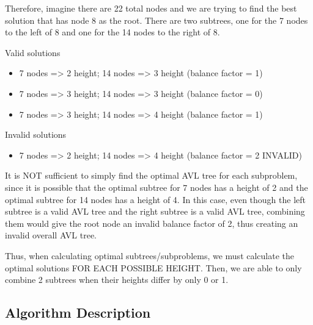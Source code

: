 \documentclass[a4paper]{article}
\begin{document}
Therefore, imagine there are 22 total nodes and we are trying to find the best solution that has node 8 as the root. There are two subtrees, one for the 7 nodes to the left of 8 and one for the 14 nodes to the right of 8.

Valid solutions
\begin{itemize}
    \item 7 nodes => 2 height; 14 nodes => 3 height (balance factor = 1)
    \item 7 nodes => 3 height; 14 nodes => 3 height (balance factor = 0)
    \item 7 nodes => 3 height; 14 nodes => 4 height (balance factor = 1)
\end{itemize}

Invalid solutions
\begin{itemize}
    \item 7 nodes => 2 height; 14 nodes => 4 height (balance factor = 2 INVALID)
\end{itemize}
It is NOT sufficient to simply find the optimal AVL tree for each subproblem, since it is possible that the optimal subtree for 7 nodes has a height of 2 and the optimal subtree for 14 nodes has a height of 4. In this case, even though the left subtree is a valid AVL tree and the right subtree is a valid AVL tree, combining them would give the root node an invalid balance factor of 2, thus creating an invalid overall AVL tree.

Thus, when calculating optimal subtrees/subproblems, we must calculate the optimal solutions FOR EACH POSSIBLE HEIGHT. Then, we are able to only combine 2 subtrees when their heights differ by only 0 or 1.

\subsection{Algorithm Description}
\end{document}
